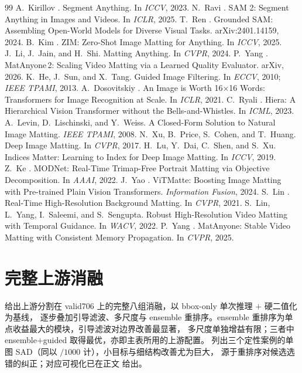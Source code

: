 \documentclass[final]{cvpr}
\begin{document}
{\small

\begin{thebibliography}{99}
 A.~Kirillov \etal. Segment Anything. In \emph{ICCV}, 2023.
 N.~Ravi \etal. SAM 2: Segment Anything in Images and Videos. In \emph{ICLR}, 2025.
 T.~Ren \etal. Grounded SAM: Assembling Open-World Models for Diverse Visual Tasks. arXiv:2401.14159, 2024.
 B.~Kim \etal. ZIM: Zero-Shot Image Matting for Anything. In \emph{ICCV}, 2025.
 J.~Li, J.~Jain, and H.~Shi. Matting Anything. In \emph{CVPR}, 2024.
 P.~Yang \etal. MatAnyone\,2: Scaling Video Matting via a Learned Quality Evaluator. arXiv, 2026.
 K.~He, J.~Sun, and X.~Tang. Guided Image Filtering. In \emph{ECCV}, 2010; \emph{IEEE TPAMI}, 2013.
 A.~Dosovitskiy \etal. An Image is Worth 16$\times$16 Words: Transformers for Image Recognition at Scale. In \emph{ICLR}, 2021.
 C.~Ryali \etal. Hiera: A Hierarchical Vision Transformer without the Bells-and-Whistles. In \emph{ICML}, 2023.
 A.~Levin, D.~Lischinski, and Y.~Weiss. A Closed-Form Solution to Natural Image Matting. \emph{IEEE TPAMI}, 2008.
 N.~Xu, B.~Price, S.~Cohen, and T.~Huang. Deep Image Matting. In \emph{CVPR}, 2017.
 H.~Lu, Y.~Dai, C.~Shen, and S.~Xu. Indices Matter: Learning to Index for Deep Image Matting. In \emph{ICCV}, 2019.
 Z.~Ke \etal. MODNet: Real-Time Trimap-Free Portrait Matting via Objective Decomposition. In \emph{AAAI}, 2022.
 J.~Yao \etal. ViTMatte: Boosting Image Matting with Pre-trained Plain Vision Transformers. \emph{Information Fusion}, 2024.
 S.~Lin \etal. Real-Time High-Resolution Background Matting. In \emph{CVPR}, 2021.
 S.~Lin, L.~Yang, I.~Saleemi, and S.~Sengupta. Robust High-Resolution Video Matting with Temporal Guidance. In \emph{WACV}, 2022.
 P.~Yang \etal. MatAnyone: Stable Video Matting with Consistent Memory Propagation. In \emph{CVPR}, 2025.
\end{thebibliography}
}

\clearpage
\appendix
\onecolumn

\section{完整上游消融}
\label{sec:appendix-sam}
 给出上游分割在 valid706 上的完整八组消融，以 bbox-only 单次推理 $+$ 硬二值化为基线，
逐步叠加引导滤波、多尺度与 ensemble 重排序。ensemble 重排序为单点收益最大的模块，引导滤波对边界改善最显著，
多尺度单独增益有限；三者中 ensemble$+$guided 取得最优，亦即主表所用的上游配置。
 列出三个定性案例的单图 SAD（同以 $/1000$ 计），小目标与细结构改善尤为巨大，
源于重排序对候选选错的纠正；对应可视化已在正文  给出。
\end{document}
